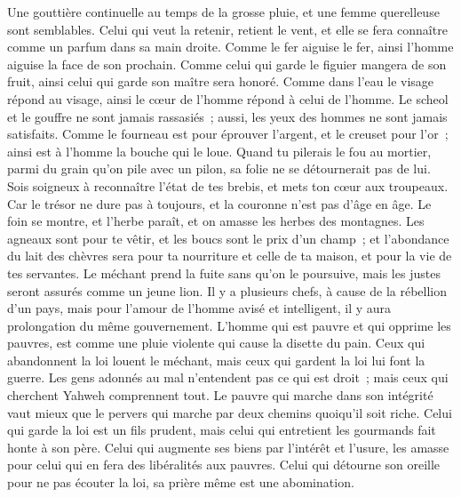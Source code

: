 \begin{multicols}{2}
Une gouttière continuelle au temps de la grosse pluie, et une femme querelleuse sont semblables.
Celui qui veut la retenir, retient le vent, et elle se fera connaître comme un parfum dans sa main droite. 
Comme le fer aiguise le fer, ainsi l'homme aiguise la face de son prochain.
Comme celui qui garde le figuier mangera de son fruit, ainsi celui qui garde son maître sera honoré.
Comme dans l'eau le visage répond au visage, ainsi le cœur de l'homme répond à celui de l'homme.
Le scheol et le gouffre ne sont jamais rassasiés~; aussi, les yeux des hommes ne sont jamais satisfaits.
Comme le fourneau est pour éprouver l'argent, et le creuset pour l'or~; ainsi est à l'homme la bouche qui le loue.
Quand tu pilerais le fou au mortier, parmi du grain qu'on pile avec un pilon, sa folie ne se détournerait pas de lui.
Sois soigneux à reconnaître l'état de tes brebis, et mets ton cœur aux troupeaux.
Car le trésor ne dure pas à toujours, et la couronne n'est pas d'âge en âge.
Le foin se montre, et l'herbe paraît, et on amasse les herbes des montagnes.
Les agneaux sont pour te vêtir, et les boucs sont le prix d'un champ~;
et l'abondance du lait des chèvres sera pour ta nourriture et celle de ta maison, et pour la vie de tes servantes.
\VerseOne{}Le méchant prend la fuite sans qu'on le poursuive, mais les justes seront assurés comme un jeune lion.
Il y a plusieurs chefs, à cause de la rébellion d'un pays, mais pour l'amour de l'homme avisé et intelligent, il y aura prolongation du même gouvernement.
L'homme qui est pauvre et qui opprime les pauvres, est comme une pluie violente qui cause la disette du pain.
Ceux qui abandonnent la loi louent le méchant, mais ceux qui gardent la loi lui font la guerre.
Les gens adonnés au mal n'entendent pas ce qui est droit~; mais ceux qui cherchent Yahweh comprennent tout.
Le pauvre qui marche dans son intégrité vaut mieux que le pervers qui marche par deux chemins quoiqu'il soit riche.
Celui qui garde la loi est un fils prudent, mais celui qui entretient les gourmands fait honte à son père.
Celui qui augmente ses biens par l'intérêt et l'usure, les amasse pour celui qui en fera des libéralités aux pauvres.
Celui qui détourne son oreille pour ne pas écouter la loi, sa prière même est une abomination.

\end{multicols}
